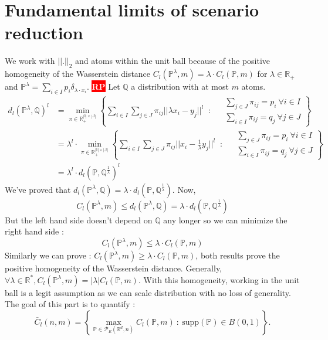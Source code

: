\documentclass{amsart}
\newcommand{\nb}[3]{
		{\colorbox{#2}{\bfseries\sffamily\tiny\textcolor{white}{#1}}}
		{\textcolor{#2}{\text{$\blacktriangleright$}{\textcolor{#2}{#3}}\text{$\blacktriangleleft$}}}}
\newcommand{\rp}[1]{\nb{RP}{red}{#1}}
\begin{document}
\section{Fundamental limits of scenario reduction}
We work with $||.||_2$ and atoms within the unit ball because of the positive homogeneity of the Wasserstein distance $C_l(\mathbb{P}^\lambda,m)=\lambda \cdot C_l(\mathbb{P},m)$ for $\lambda\in\mathbb{R}_+$ and $\mathbb{P}^\lambda=\sum_{i\in I}p_i\delta_{\lambda\cdot x_i}$. \rp{not obvious tbh} Let $\mathbb{Q}$ a distribution with at most $m$ atoms.
\begin{align*}
    d_l(\mathbb{P}^\lambda,\mathbb{Q})^l&=\min_{\pi\in\mathbb{R_+^{|I|\times|J|}}}\left\{ 
\sum_{i\in I}\sum_{j\in J}\pi_{ij}||\lambda x_i-y_j||^l \: \text{ : } \:  \begin{aligned}
& \sum_{j\in J}\pi_{ij}=p_i \: \forall i\in I \\
& \sum_{i\in I}\pi_{ij}=q_j \: \forall j\in J
\end{aligned}\right\} \\&=\lambda^l\cdot\min_{\pi\in\mathbb{R_+^{|I|\times|J|}}}\left\{ 
\sum_{i\in I}\sum_{j\in J}\pi_{ij}||x_i-\frac{1}{\lambda}y_j||^l \: \text{ : } \:  \begin{aligned}
& \sum_{j\in J}\pi_{ij}=p_i \: \forall i\in I \\
& \sum_{i\in I}\pi_{ij}=q_j \: \forall j\in J
\end{aligned}\right\} \\
&=\lambda^l \cdot d_l(\mathbb{P},\mathbb{Q}^{\frac{1}{\lambda}})^l
\end{align*}
We've proved that $d_l(\mathbb{P}^\lambda,\mathbb{Q})=\lambda\cdot d_l(\mathbb{P},\mathbb{Q}^{\frac{1}{\lambda}})$. Now, $$C_l(\mathbb{P}^\lambda,m)\leq d_l(\mathbb{P}^\lambda,\mathbb{Q})=\lambda\cdot d_l(\mathbb{P},\mathbb{Q}^{\frac{1}{\lambda}})$$
But the left hand side doesn't depend on $\mathbb{Q}$ any longer so we can minimize the right hand side :
$$
C_l(\mathbb{P}^\lambda,m)\leq \lambda\cdot C_l(\mathbb{P},m)
$$
Similarly we can prove : $C_l(\mathbb{P}^\lambda,m)\geq \lambda\cdot C_l(\mathbb{P},m)$, both results prove the positive homogeneity of the Wasserstein distance. Generally, $\forall \lambda\in\mathbb{R^*}, C_l(\mathbb{P}^\lambda,m)=|\lambda|C_l(\mathbb{P},m).$
With this homogeneity, working in the unit ball is a legit assumption as we can scale distribution with no loss of generality. The goal of this part is to quantify : 
$$
\bar{C}_l(n,m)=\left\{\max_{\mathbb{P}\in\mathcal{P}_E(\mathbb{R}^d,n)}C_l(\mathbb{P},m)\: :\: \text{supp}(\mathbb{P})\in B(0,1)\right\}.
$$
\end{document}
